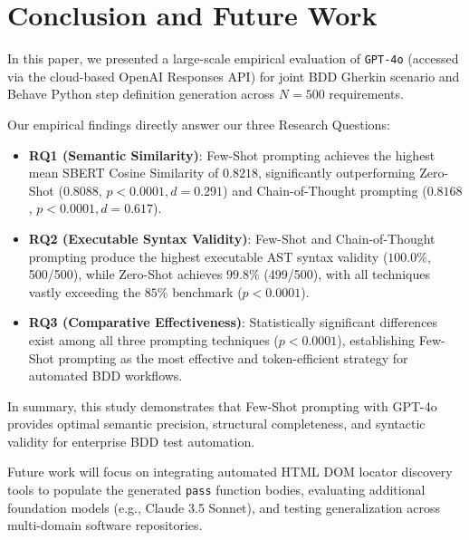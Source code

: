 \section{Conclusion and Future Work}
\label{sec:conclusion}

In this paper, we presented a large-scale empirical evaluation of \texttt{GPT-4o} (accessed via the cloud-based OpenAI Responses API) for joint BDD Gherkin scenario and Behave Python step definition generation across $N=500$ requirements.

Our empirical findings directly answer our three Research Questions:
\begin{itemize}
    \item \textbf{RQ1 (Semantic Similarity)}: Few-Shot prompting achieves the highest mean SBERT Cosine Similarity of $0.8218$, significantly outperforming Zero-Shot ($0.8088$, $p < 0.0001, d=0.291$) and Chain-of-Thought prompting ($0.8168$, $p < 0.0001, d=0.617$).
    \item \textbf{RQ2 (Executable Syntax Validity)}: Few-Shot and Chain-of-Thought prompting produce the highest executable AST syntax validity ($100.0\%$, 500/500), while Zero-Shot achieves $99.8\%$ (499/500), with all techniques vastly exceeding the $85\%$ benchmark ($p < 0.0001$).
    \item \textbf{RQ3 (Comparative Effectiveness)}: Statistically significant differences exist among all three prompting techniques ($p < 0.0001$), establishing Few-Shot prompting as the most effective and token-efficient strategy for automated BDD workflows.
\end{itemize}

In summary, this study demonstrates that Few-Shot prompting with GPT-4o provides optimal semantic precision, structural completeness, and syntactic validity for enterprise BDD test automation.

Future work will focus on integrating automated HTML DOM locator discovery tools to populate the generated \texttt{pass} function bodies, evaluating additional foundation models (e.g., Claude 3.5 Sonnet), and testing generalization across multi-domain software repositories.
